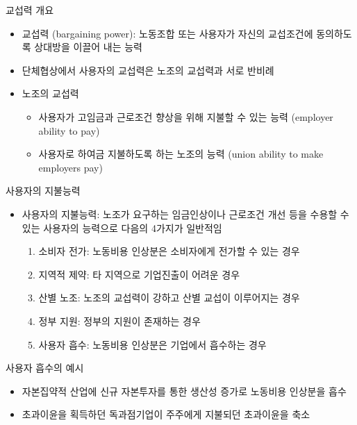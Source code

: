 \documentclass[aspectratio=169,xcolor=dvipsnames,handout]{beamer}
\begin{document}
\begin{frame}{교섭력 개요}
    \begin{itemize}[<+->]
        \item 교섭력 (bargaining power): 노동조합 또는 사용자가 자신의 교섭조건에 동의하도록 상대방을 이끌어 내는 능력
        \item 단체협상에서 사용자의 교섭력은 노조의 교섭력과 서로 반비례
        \item 노조의 교섭력
        \begin{itemize}[<+->]
            \item 사용자가 고임금과 근로조건 향상을 위해 지불할 수 있는 능력 (employer ability to pay)
            \item 사용자로 하여금 지불하도록 하는 노조의 능력 (union ability to make employers pay)
        \end{itemize}
    \end{itemize}
\end{frame}

\begin{frame}{사용자의 지불능력}
    \begin{itemize}[<+->]
        \item 사용자의 지불능력: 노조가 요구하는 임금인상이나 근로조건 개선 등을 수용할 수 있는 사용자의 능력으로 다음의 4가지가 일반적임
        \begin{enumerate}[<+->]
            \item 소비자 전가: 노동비용 인상분은 소비자에게 전가할 수 있는 경우
            \item 지역적 제약: 타 지역으로 기업진출이 어려운 경우
            \item 산별 노조: 노조의 교섭력이 강하고 산별 교섭이 이루어지는 경우
            \item 정부 지원: 정부의 지원이 존재하는 경우
            \item 사용자 흡수: 노동비용 인상분은 기업에서 흡수하는 경우
        \end{enumerate}
    \end{itemize}
    \begin{exampleblock}{사용자 흡수의 예시}
        \begin{itemize}[<+->]
            \item 자본집약적 산업에 신규 자본투자를 통한 생산성 증가로 노동비용 인상분을 흡수
            \item 초과이윤을 획득하던 독과점기업이 주주에게 지불되던 초과이윤을 축소
        \end{itemize}
    \end{exampleblock}
\end{frame}
\end{document}
